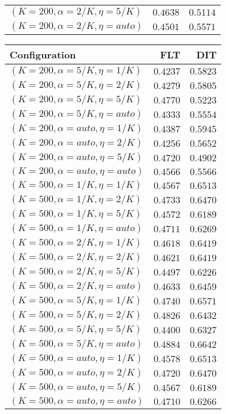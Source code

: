\begin{table}
\begin{spacing}{1.2}
{\begin{tabular}{lrr}
   $(K=200,\alpha=2/K,\eta=5/K)$ & $0.4638$ & $0.5114$ \\
  $(K=200,\alpha=2/K,\eta=auto)$ & $0.4501$ & $0.5571$ \\
\bottomrule
\end{tabular}
} \hfill \parbox{.45\linewidth}{\centering \begin{tabular}{lrr}
\toprule
                   Configuration &           FLT &           DIT \\
\midrule
   $(K=200,\alpha=5/K,\eta=1/K)$ &      $0.4237$ &      $0.5823$ \\
   $(K=200,\alpha=5/K,\eta=2/K)$ &      $0.4279$ &      $0.5805$ \\
   $(K=200,\alpha=5/K,\eta=5/K)$ &      $0.4770$ &      $0.5223$ \\
  $(K=200,\alpha=5/K,\eta=auto)$ &      $0.4333$ &      $0.5554$ \\
  $(K=200,\alpha=auto,\eta=1/K)$ &      $0.4387$ &      $0.5945$ \\
  $(K=200,\alpha=auto,\eta=2/K)$ &      $0.4256$ &      $0.5652$ \\
  $(K=200,\alpha=auto,\eta=5/K)$ &      $0.4720$ &      $0.4902$ \\
 $(K=200,\alpha=auto,\eta=auto)$ &      $0.4566$ &      $0.5566$ \\
   $(K=500,\alpha=1/K,\eta=1/K)$ &      $0.4567$ &      $0.6513$ \\
   $(K=500,\alpha=1/K,\eta=2/K)$ &      $0.4733$ &      $0.6470$ \\
   $(K=500,\alpha=1/K,\eta=5/K)$ &      $0.4572$ &      $0.6189$ \\
  $(K=500,\alpha=1/K,\eta=auto)$ &      $0.4711$ &      $0.6269$ \\
   $(K=500,\alpha=2/K,\eta=1/K)$ &      $0.4618$ &      $0.6419$ \\
   $(K=500,\alpha=2/K,\eta=2/K)$ &      $0.4621$ &      $0.6419$ \\
   $(K=500,\alpha=2/K,\eta=5/K)$ &      $0.4497$ &      $0.6226$ \\
  $(K=500,\alpha=2/K,\eta=auto)$ &      $0.4633$ &      $0.6459$ \\
   $(K=500,\alpha=5/K,\eta=1/K)$ &      $0.4740$ &      $0.6571$ \\
   $(K=500,\alpha=5/K,\eta=2/K)$ &      $0.4826$ &      $0.6432$ \\
   $(K=500,\alpha=5/K,\eta=5/K)$ &      $0.4400$ &      $0.6327$ \\
  $(K=500,\alpha=5/K,\eta=auto)$ & $\bm{0.4884}$ & $\bm{0.6642}$ \\
  $(K=500,\alpha=auto,\eta=1/K)$ &      $0.4578$ &      $0.6513$ \\
  $(K=500,\alpha=auto,\eta=2/K)$ &      $0.4720$ &      $0.6470$ \\
  $(K=500,\alpha=auto,\eta=5/K)$ &      $0.4567$ &      $0.6189$ \\
 $(K=500,\alpha=auto,\eta=auto)$ &      $0.4710$ &      $0.6266$ \\
\bottomrule
\end{tabular}
}
\end{spacing}
\end{table}
